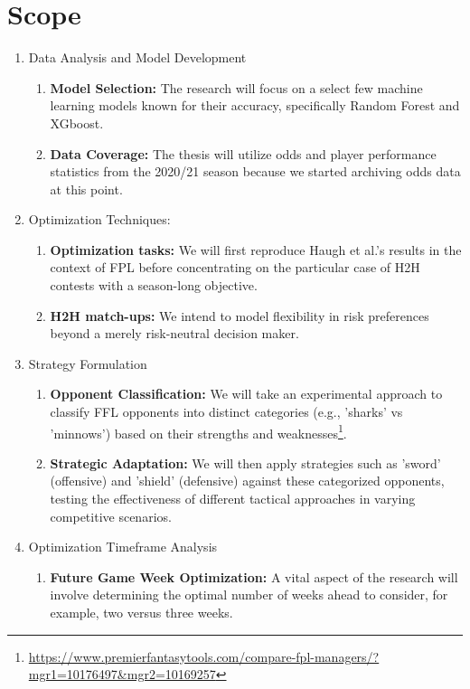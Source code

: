 		\section{Scope} \label{sec:scope}
			\begin{enumerate}
				\item[(i)] Data Analysis and Model Development
				\begin{enumerate}
					\item \textbf{Model Selection:} The research will focus on a select few machine learning models known for their accuracy, specifically Random Forest and XGboost.
					\item \textbf{Data Coverage:} The thesis will utilize odds and player performance statistics from the 2020/21 season because we started archiving odds data at this point.
				\end{enumerate}

				\item[(ii)] Optimization Techniques:
				\begin{enumerate}
					\item \textbf{Optimization tasks:} We will first reproduce Haugh et al.’s results in the context of FPL before concentrating on the particular case of H2H contests with a season-long objective.
					\item \textbf{H2H match-ups:} We intend to model flexibility in risk preferences beyond a merely risk-neutral decision maker.
				\end{enumerate}

				\item[(iii)] Strategy Formulation
				\begin{enumerate}
					\item \textbf{Opponent Classification:} We will take an experimental approach to classify FFL opponents into distinct categories (e.g., 'sharks' vs 'minnows') based on their strengths and weaknesses\footnote{\url{https://www.premierfantasytools.com/compare-fpl-managers/?mgr1=10176497&mgr2=10169257}}.
					\item \textbf{Strategic Adaptation:} We will then apply strategies such as 'sword' (offensive) and 'shield' (defensive) against these categorized opponents, testing the effectiveness of different tactical approaches in varying competitive scenarios.
				\end{enumerate}

				\item[(iv)] Optimization Timeframe Analysis
				\begin{enumerate}
					\item \textbf{Future Game Week Optimization:} A vital aspect of the research will involve determining the optimal number of weeks ahead to consider, for example, two versus three weeks.
				\end{enumerate}


\end{enumerate}
